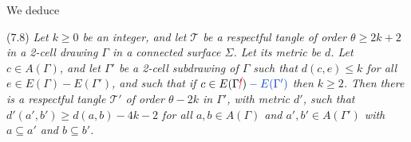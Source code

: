 We deduce

\stmt
(7.8) \textit{Let $k \ge 0$ be an integer, and let $\mathscr{T}$ be a respectful tangle of order $\theta \ge 2k + 2$ in a 2-cell drawing $\Gamma$ in a connected surface $\Sigma$. Let its metric be $d$. Let $c \in A(\Gamma)$, and let $\Gamma'$ be a 2-cell subdrawing of $\Gamma$ such that $d(c, e) \le k$ for all $e \in E(\Gamma) - E(\Gamma')$, and such that if $c \in E(\Gamma\delm{'})\fix{{} - E(\Gamma')}$ then $k \ge 2$. Then there is a respectful tangle $\mathscr{T}'$ of order $\theta - 2k$ in $\Gamma'$, with metric $d'$, such that $d'(a', b') \ge d(a, b) - 4k - 2$ for all $a, b \in A(\Gamma)$ and $a', b' \in A(\Gamma')$ with $a \subseteq a'$ and $b \subseteq b'$.}
